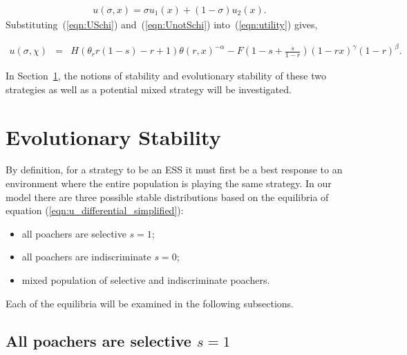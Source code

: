 \documentclass[10pt]{article}
\begin{document}

\begin{eqnarray}
\label{eqn:utility}
u(\sigma, x) = \sigma u_1(x) +(1 - \sigma) u_2(x).
\end{eqnarray}
Substituting~(\ref{eqn:USchi}) and~(\ref{eqn:UnotSchi}) into~(\ref{eqn:utility}) gives,

\begin{eqnarray}
\label{eqn:tutility2}
u(\sigma, \chi) &=&
H (\theta_r r(1-s) - r + 1)\theta(r,x)^{-\alpha} - F\left(1-s + \frac{s}{1-r} \right)(1-rx)^{\gamma}(1-r)^{\beta} .
\end{eqnarray}

In Section~\ref{section:evolutionary_stability}, the notions of stability
and evolutionary stability of these two strategies as well as a potential 
mixed strategy will be investigated.

\section{Evolutionary Stability}\label{section:evolutionary_stability}

By definition, for a strategy to be an ESS it must first be a best response to an 
environment where the entire population is playing the same strategy.
In our model there are three possible stable distributions based on the
equilibria of equation (\ref{eqn:u_differential_simplified}):

\begin{itemize} 
    \item all poachers are selective \(s=1\);
    \item all poachers are indiscriminate \(s=0\);
    \item mixed population of selective and indiscriminate poachers.
\end{itemize}

Each of the equilibria will be examined in the following subsections.

\subsection{All poachers are selective \(s=1\)}
\end{document}
